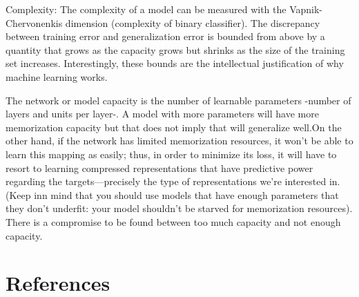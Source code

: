\documentclass[12pt]{report}
\begin{document}
Complexity: The complexity of a model can be measured with the Vapnik-Chervonenkis dimension (complexity of binary classifier). The discrepancy between training error and generalization error is bounded from above by a quantity that grows as the capacity grows but shrinks as the size of the training set increases. Interestingly, these bounds are the intellectual justification of why machine learning works.

The network or model capacity is the number of learnable parameters -number of layers and units per layer-. A model with more parameters will have more memorization capacity but that does not imply that will generalize well.On the other hand, if the network has limited memorization resources, it won’t be able to learn this mapping as easily; thus, in order to minimize its loss, it will have to resort to learning compressed representations that have predictive power regarding the targets—precisely the type of representations we’re interested in. (Keep inn mind that you should use models that have enough parameters that they don’t underfit: your model shouldn’t be starved for memorization resources). There is a compromise to be found between too much capacity and not enough capacity.

\newpage
\section*{References}




\end{document}
